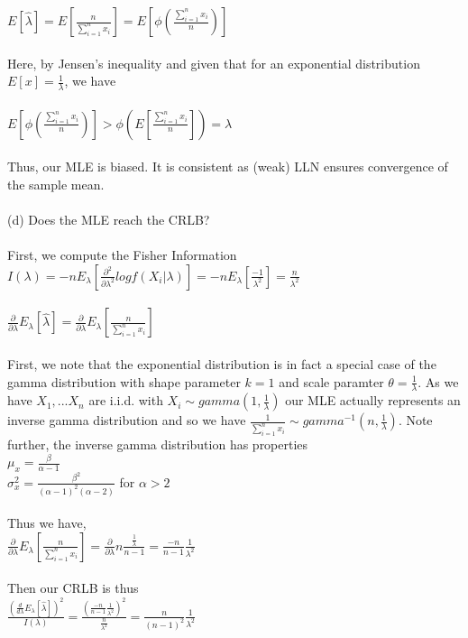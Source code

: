 \documentclass{article}
\begin{document}
$E[\hat{\lambda}]=E[\frac{n}{\sum_{i=1}^nx_i}]=E[\phi(\frac{\sum_{i=1}^nx_i}{n})]$\\\\
Here, by Jensen's inequality and given that for an exponential distribution $E[x]=\frac{1}{\lambda}$, we have\\\\
$E[\phi(\frac{\sum_{i=1}^nx_i}{n})]>\phi(E[\frac{\sum_{i=1}^nx_i}{n}])=\lambda$\\\\
Thus, our MLE is biased.  It is consistent as (weak) LLN ensures convergence of the sample mean.\\\\
(d) Does the MLE reach the CRLB?\\\\
First, we compute the Fisher Information\\
$I(\lambda)=-nE_\lambda[\frac{\partial^2}{\partial \lambda^2}logf(X_i|\lambda)]=-nE_\lambda[\frac{-1}{\lambda^2}]=\frac{n}{\lambda^2}$\\\\
$\frac{\partial}{\partial \lambda}E_\lambda[\hat{\lambda}]=\frac{\partial}{\partial \lambda}E_\lambda[\frac{n}{\sum_{i=1}^nx_i}]$\\\\
First, we note that the exponential distribution is in fact a special case of the gamma distribution with shape parameter $k=1$ and scale paramter $\theta=\frac{1}{\lambda}$.  As we have $X_1,...X_n$ are i.i.d. with $X_i\sim gamma(1,\frac{1}{\lambda})$ our MLE actually represents an inverse gamma distribution and so we have  $\frac{1}{\sum_{i=1}^nx_i}\sim gamma^{-1}(n,\frac{1}{\lambda})$.  Note further, the inverse gamma distribution has properties\\
$\mu_x=\frac{\beta}{\alpha-1}$\\
$\sigma^2_x=\frac{\beta^2}{(\alpha-1)^2(\alpha-2)}$ for $\alpha>2$\\\\
Thus we have,\\
$\frac{\partial}{\partial \lambda}E_\lambda[\frac{n}{\sum_{i=1}^nx_i}]=\frac{\partial}{\partial \lambda}n\frac{\frac{1}{\lambda}}{n-1}=\frac{-n}{n-1}\frac{1}{\lambda^2}$\\\\
Then our CRLB is thus\\
$\frac{(\frac{d}{d\lambda}E_\lambda[\hat{\lambda}])^2}{I(\lambda)}=\frac{(\frac{-n}{n-1}\frac{1}{\lambda^2})^2}{\frac{n}{\lambda^2}}=\frac{n}{(n-1)^2}\frac{1}{\lambda^2}$\\\\
\end{document}
